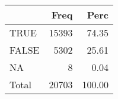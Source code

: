 
\begin{tabular}[t]{lrr}
\toprule
  & Freq & Perc\\
\midrule
TRUE & 15393 & 74.35\\
FALSE & 5302 & 25.61\\
NA & 8 & 0.04\\
Total & 20703 & 100.00\\
\bottomrule
\end{tabular}
